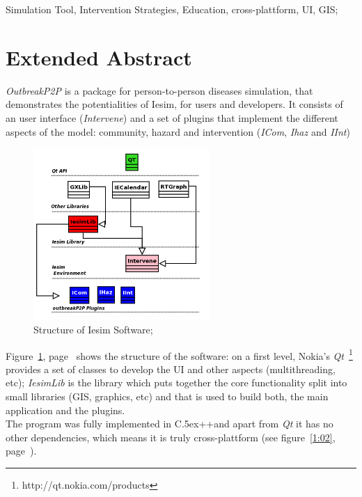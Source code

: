 \documentclass[printer]{tGIS2e}
\def\Cplusplus{{\rm C\raise.5ex\hbox{\small ++}}}
\begin{document}
    \begin{keywords} Simulation Tool, Intervention Strategies, Education, cross-plattform, UI, GIS;\end{keywords}\bigskip

\section{Extended Abstract}\label{sec:extended}

\textit{OutbreakP2P} is a package for person-to-person diseases simulation, that demonstrates the potentialities of Iesim, for users and developers. It consists of an user interface (\textit{Intervene}) and a set of plugins that implement the different aspects of the model: community, hazard and intervention (\textit{ICom}, \textit{Ihaz} and \textit{IInt})\\

  \begin{figure}[!ht]%
    \begin{center} 
	\includegraphics[width=0.6\textwidth]{pics/intervene2}%
      \caption[Structure of Iesim Software;]{Structure of Iesim Software;}
      \label{1:01} %
    \end{center} 
  \end{figure}
Figure~\ref{1:01}, page~\pageref{1:01} shows the structure of the software: on a first level, Nokia's \textit{Qt}~\footnote{http://qt.nokia.com/products}
 provides a set of classes to develop the UI and other aspects (multithreading, etc); \textit{IesimLib} is the  library which puts together the core functionality split into small libraries (GIS, graphics, etc) and that is used to build both, the main application and the plugins.\\
The program was fully implemented in \Cplusplus and apart from \textit{Qt} it has no other dependencies, which means it is truly cross-plattform (see figure~\ref{1:02}, page~\pageref{1:02}).\\
\end{document}
